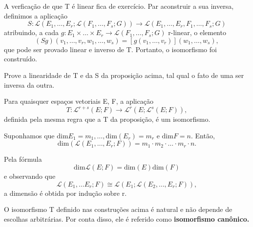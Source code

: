 \documentclass[../differential_forms.tex]{subfiles}
\begin{document}
\begin{proof*}
	A verficação de que T é linear fica de exercício. Par aconstruir a sua inversa, definimos a aplicação
	\[
		S:\mathcal{L}(E_1, \dotsc , E_r; \mathcal{L}(F_1,\dotsc , F_s; G))\rightarrow \mathcal{L}(E_1, \dotsc ,E_r, F_1, \dotsc , F_s; G)
	\]
	atribuindo, a cada \(g:E_1 \times \dotsc \times E_r\rightarrow \mathcal{L}(F_1, \dotsc , F_s; G)\) r-linear, o elemento
	\[
		(Sg)(v_1, \dotsc , v_r, w_1, \dotsc ,w_s) = [g(v_1, \dotsc , v_r)](w_1, \dotsc , w_s),
	\]
	que pode ser provado linear e inverso de T. Portanto, o isomorfismo foi construído. \qedsymbol
\end{proof*}
\begin{exr}
	Prove a linearidade de T e da S da proposição acima, tal qual o fato de uma ser inversa da outra.
\end{exr}
\begin{crl*}
	Para quaisquer espaços vetoriais E, F, a aplicação
	\[
		T:\mathcal{L}^{r+s}(E; F)\rightarrow \mathcal{L}^{r}(E; \mathcal{L}^{s}(E; F)),
	\]
	definida pela mesma regra que a T da proposição, é um isomorfismo.
\end{crl*}
\begin{crl*}
	Suponhamos que \(\mathrm{dim}E_1 = m_1, \dotsc , \mathrm{dim}(E_r) = m_r \) e \(\mathrm{dim}F = n\). Então,
	\[
		\mathrm{dim}(\mathcal{L}(E_1, \dotsc , E_r; F)) = m_1 \cdot m_2 \cdot \dotsc \cdot m_r \cdot n.
	\]
\end{crl*}
\begin{proof*}
	Pela fórmula
	\[
		\mathrm{dim}\mathcal{L}(E; F) = \mathrm{dim}(E)\mathrm{dim}(F)
	\]
	e observando que
	\[
		\mathcal{L}(E_1, \dotsc E_r;F) \cong \mathcal{L}(E_1; \mathcal{L}(E_2, \dotsc , E_r; F)),
	\]
	a dimensão é obtida por indução sobre r. \qedsymbol
\end{proof*}
\begin{tcolorbox}[
		skin=enhanced,
		title=Observação,
		fonttitle=\bfseries,
		colframe=black,
		colbacktitle=cyan!75!white,
		colback=cyan!15,
		colbacklower=black,
		coltitle=black,
		drop fuzzy shadow,
	]
	O isomorfismo T definido nas construções acima é natural e não depende de escolhas arbitrárias. Por conta disso, ele é referido como \textbf{isomorfismo canônico.}
\end{tcolorbox}
\end{document}
